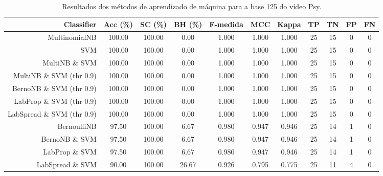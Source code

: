 \begin{table}[!htb]
\centering
\caption{Resultados dos métodos de aprendizado de máquina para a base 125 do vídeo Psy.}
\label{tab:Psy-125}
\begin{tabular}{r|c|c|c|c|c|c|c|c|c|c}
\hline\hline
Classifier & Acc (\%) & SC (\%) & BH (\%) & F-medida & MCC & Kappa & TP & TN & FP & FN \\ \hline
MultinomialNB & 100.00 & 100.00 & 0.00 & 1.000 & 1.000 & 1.000 & 25 & 15 & 0 & 0 \\ 
SVM & 100.00 & 100.00 & 0.00 & 1.000 & 1.000 & 1.000 & 25 & 15 & 0 & 0 \\ 
MultiNB \& SVM & 100.00 & 100.00 & 0.00 & 1.000 & 1.000 & 1.000 & 25 & 15 & 0 & 0 \\ 
MultiNB \& SVM (thr 0.9) & 100.00 & 100.00 & 0.00 & 1.000 & 1.000 & 1.000 & 25 & 15 & 0 & 0 \\ 
BernoNB \& SVM (thr 0.9) & 100.00 & 100.00 & 0.00 & 1.000 & 1.000 & 1.000 & 25 & 15 & 0 & 0 \\ 
LabProp \& SVM (thr 0.9) & 100.00 & 100.00 & 0.00 & 1.000 & 1.000 & 1.000 & 25 & 15 & 0 & 0 \\ 
LabSpread \& SVM (thr 0.9) & 100.00 & 100.00 & 0.00 & 1.000 & 1.000 & 1.000 & 25 & 15 & 0 & 0 \\ 
BernoulliNB & 97.50 & 100.00 & 6.67 & 0.980 & 0.947 & 0.946 & 25 & 14 & 1 & 0 \\ 
BernoNB \& SVM & 97.50 & 100.00 & 6.67 & 0.980 & 0.947 & 0.946 & 25 & 14 & 1 & 0 \\ 
LabProp \& SVM & 97.50 & 100.00 & 6.67 & 0.980 & 0.947 & 0.946 & 25 & 14 & 1 & 0 \\ 
LabSpread \& SVM & 90.00 & 100.00 & 26.67 & 0.926 & 0.795 & 0.775 & 25 & 11 & 4 & 0 \\ 
\hline\hline
\end{tabular}
\end{table}
